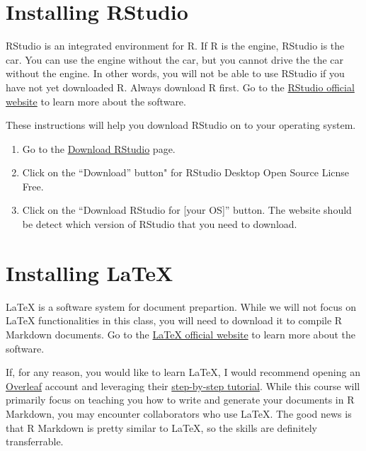 \documentclass[
]{book}
\begin{document}
\hypertarget{install-Rstudio}{%
\section{Installing RStudio}\label{install-Rstudio}}

RStudio is an integrated environment for R. If R is the engine, RStudio is the car. You can use the engine without the car, but you cannot drive the the car without the engine. In other words, you will not be able to use RStudio if you have not yet downloaded R. Always download R first. Go to the \href{https://rstudio.com/}{RStudio official website} to learn more about the software.

These instructions will help you download RStudio on to your operating system.

\begin{enumerate}
\def\labelenumi{\arabic{enumi}.}
\item
  Go to the \href{https://rstudio.com/products/rstudio/download/}{Download RStudio} page.
\item
  Click on the ``Download'' button" for RStudio Desktop Open Source Licnse Free.
\item
  Click on the ``Download RStudio for {[}your OS{]}'' button. The website should be detect which version of RStudio that you need to download.
\end{enumerate}

\hypertarget{install-latex}{%
\section{Installing LaTeX}\label{install-latex}}

LaTeX is a software system for document prepartion. While we will not focus on LaTeX functionalities in this class, you will need to download it to compile R Markdown documents. Go to the \href{https://www.latex-project.org/}{LaTeX official website} to learn more about the software.

If, for any reason, you would like to learn LaTeX, I would recommend opening an \href{https://www.overleaf.com}{Overleaf} account and leveraging their \href{https://www.overleaf.com/learn/latex/Learn_LaTeX_in_30_minutes}{step-by-step tutorial}. While this course will primarily focus on teaching you how to write and generate your documents in R Markdown, you may encounter collaborators who use LaTeX. The good news is that R Markdown is pretty similar to LaTeX, so the skills are definitely transferrable.
\end{document}
